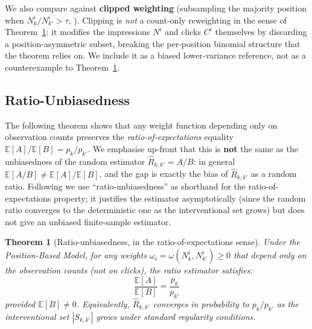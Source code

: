 \documentclass[sigconf]{acmart}
\newtheorem{theorem}{Theorem}
\begin{document}
We also compare against \textbf{clipped weighting} (subsampling the majority position when
$N_k^i/N_{k'}^i > \tau$, \cite{bottou2013counterfactual}). Clipping is \emph{not} a count-only
reweighting in the sense of Theorem~\ref{thm:ratio_unbiased}: it modifies the impressions
$N^i$ and clicks $C^i$ themselves by discarding a position-asymmetric subset, breaking the
per-position binomial structure that the theorem relies on. We include it as a biased
lower-variance reference, not as a counterexample to Theorem~\ref{thm:ratio_unbiased}.

\subsection{Ratio-Unbiasedness}

The following theorem shows that any weight function depending only on observation counts preserves the
\emph{ratio-of-expectations} equality $\mathbb{E}[A]/\mathbb{E}[B] = p_k/p_{k'}$.
We emphasise up-front that this is \textbf{not} the same as the unbiasedness of the random
estimator $\hat{R}_{k,k'} = A/B$: in general $\mathbb{E}[A/B] \neq \mathbb{E}[A]/\mathbb{E}[B]$,
and the gap is exactly the bias of $\hat{R}_{k,k'}$ as a random ratio.
Following \cite{agarwal2019estimating} we use ``ratio-unbiasedness'' as shorthand for the
ratio-of-expectations property; it justifies the estimator asymptotically (since the random ratio
converges to the deterministic one as the interventional set grows) but does not give an
unbiased finite-sample estimator.

\begin{theorem}[Ratio-unbiasedness, in the ratio-of-expectations sense]
\label{thm:ratio_unbiased}
Under the Position-Based Model, for any weights $\omega_i = \omega(N_k^i, N_{k'}^i) \geq 0$ that
depend only on the observation counts (not on clicks), the ratio estimator satisfies:
\[
\frac{\mathbb{E}[A]}{\mathbb{E}[B]} = \frac{p_k}{p_{k'}}
\]
provided $\mathbb{E}[B] \neq 0$. Equivalently, $\hat{R}_{k,k'}$ converges in probability to
$p_k/p_{k'}$ as the interventional set $|S_{k,k'}|$ grows under standard regularity conditions.
\end{theorem}
\end{document}
